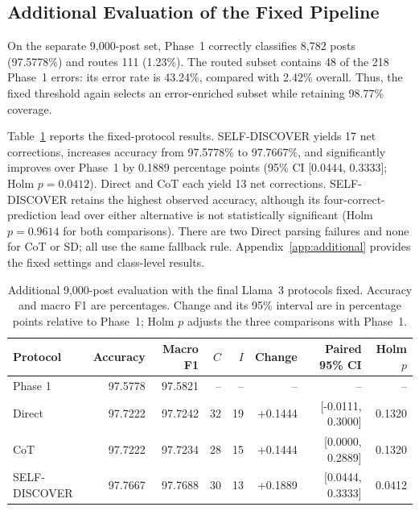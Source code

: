 \documentclass{ieeeaccess}
\begin{document}
\subsection{Additional Evaluation of the Fixed Pipeline}
On the separate 9,000-post set, Phase~1 correctly classifies 8,782 posts (97.5778\%) and routes 111 (1.23\%). The routed subset contains 48 of the 218 Phase~1 errors: its error rate is 43.24\%, compared with 2.42\% overall. Thus, the fixed threshold again selects an error-enriched subset while retaining 98.77\% coverage.

Table~\ref{tab:additional9000} reports the fixed-protocol results. SELF-DISCOVER yields 17 net corrections, increases accuracy from 97.5778\% to 97.7667\%, and significantly improves over Phase~1 by 0.1889 percentage points (95\% CI [0.0444, 0.3333]; Holm $p=0.0412$). Direct and CoT each yield 13 net corrections. SELF-DISCOVER retains the highest observed accuracy, although its four-correct-prediction lead over either alternative is not statistically significant (Holm $p=0.9614$ for both comparisons). There are two Direct parsing failures and none for CoT or SD; all use the same fallback rule. Appendix~\ref{app:additional} provides the fixed settings and class-level results.

\begin{table}[t]\centering\small
\setlength{\tabcolsep}{4pt}\renewcommand{\arraystretch}{1.14}
\caption{Additional 9,000-post evaluation with the final Llama~3 protocols fixed. Accuracy and macro F1 are percentages. Change and its 95\% interval are in percentage points relative to Phase~1; Holm $p$ adjusts the three comparisons with Phase~1.}
\label{tab:additional9000}
\begin{tabular*}{\textwidth}{@{\extracolsep{\fill}}lrrrrrrr@{}}\toprule
Protocol & Accuracy & Macro F1 & $C$ & $I$ & Change & Paired 95\% CI & Holm $p$ \\\midrule
Phase 1 & 97.5778 & 97.5821 & -- & -- & -- & -- & -- \\
Direct & 97.7222 & 97.7242 & 32 & 19 & +0.1444 & [-0.0111, 0.3000] & 0.1320 \\
CoT & 97.7222 & 97.7234 & 28 & 15 & +0.1444 & [0.0000, 0.2889] & 0.1320 \\
SELF-DISCOVER & 97.7667 & 97.7688 & 30 & 13 & +0.1889 & [0.0444, 0.3333] & 0.0412 \\\bottomrule
\end{tabular*}\end{table}
\end{document}
